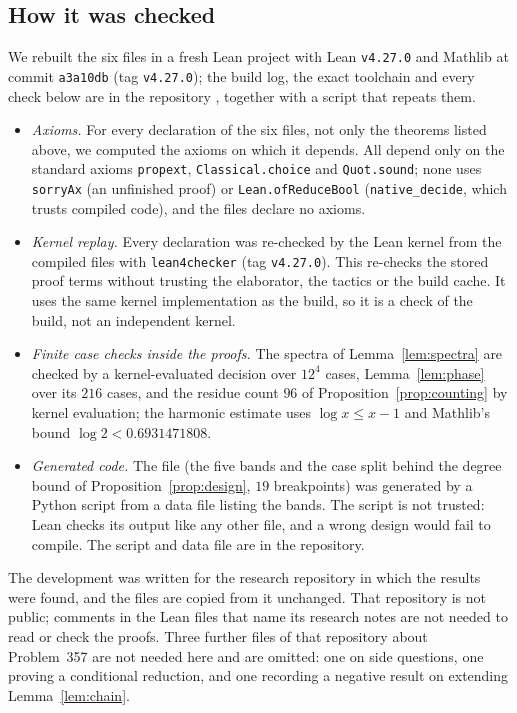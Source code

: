 \documentclass[11pt]{amsart}
\theoremstyle{remark}
\begin{document}
\subsection{How it was checked}
We rebuilt the six files in a fresh Lean project with Lean \texttt{v4.27.0} and Mathlib at commit \texttt{a3a10db} (tag
\texttt{v4.27.0}); the build log, the exact toolchain and every check below are in the repository \cite{Artifact}, together with a script
that repeats them.
\begin{itemize}
\item \emph{Axioms.} For every declaration of the six files, not only the theorems listed above, we computed the axioms on which it
depends. All depend only on the standard axioms \texttt{propext}, \texttt{Classical.choice} and \texttt{Quot.sound}; none uses
\texttt{sorryAx} (an unfinished proof) or \texttt{Lean.ofReduceBool} (\texttt{native\_decide}, which trusts compiled code), and the files
declare no axioms.
\item \emph{Kernel replay.} Every declaration was re-checked by the Lean kernel from the compiled files with \texttt{lean4checker}
\cite{lean4checker} (tag \texttt{v4.27.0}). This re-checks the stored proof terms without trusting the elaborator, the tactics or the build
cache. It uses the same kernel implementation as the build, so it is a check of the build, not an independent kernel.
\item \emph{Finite case checks inside the proofs.} The spectra of Lemma~\ref{lem:spectra} are checked by a kernel-evaluated decision over
$12^4$ cases, Lemma~\ref{lem:phase} over its $216$ cases, and the residue count $96$ of Proposition~\ref{prop:counting} by kernel
evaluation; the harmonic estimate uses $\log x\le x-1$ and Mathlib's bound $\log2<0.6931471808$.
\item \emph{Generated code.} The file  (the five bands and the case split behind the degree bound of
Proposition~\ref{prop:design}, $19$ breakpoints) was generated by a Python script from a data file listing the bands. The script is not
trusted: Lean checks its output like any other file, and a wrong design would fail to compile. The script and data file are in the
repository.
\end{itemize}
The development was written for the research repository in which the results were found, and the files are copied from it unchanged.
That repository is not public; comments in the Lean files that name its research notes are not needed to read or check the proofs.
Three further files of that repository about Problem~357 are not needed here and are omitted: one on side questions, one proving a
conditional reduction, and one recording a negative result on extending Lemma~\ref{lem:chain}.
\end{document}
